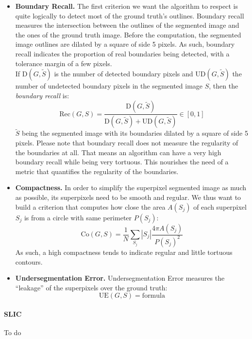 \documentclass{article}
\begin{document}
            \begin{itemize}
                \item \textbf{Boundary Recall.} The first criterion we want the algorithm to respect is quite logically to detect most of the ground truth's outlines. Boundary recall measures the intersection between the outlines of the segmented image and the ones of the ground truth image. Before the computation, the segmented image outlines are dilated by a square of side 5 pixels. As such, boundary recall indicates the proportion of real boundaries being detected, with a tolerance margin of a few pixels.\\
                If $\text{D}(G,\tilde{S})$ is the number of detected boundary pixels and $\text{UD}(G,\tilde{S})$ the number of undetected boundary pixels in the segmented image $S$, then the \textit{boundary recall} is:
                $$
                \mathrm{Rec}(G,S)=\frac{\mathrm{D}(G,\tilde{S})}{\mathrm{D}(G,\tilde{S})+\mathrm{UD}(G,\tilde{S})} \in [0,1]
                $$
                $\tilde{S}$ being the segmented image with its boundaries dilated by a square of side 5 pixels. Please note that boundary recall does not measure the regularity of the boundaries at all. That means an algorithm can have a very high boundary recall while being very tortuous. This nourishes the need of a metric that quantifies the regularity of the boundaries.

                \item \textbf{Compactness.} In order to simplify the superpixel segmented image as much as possible, its superpixels need to be smooth and regular. We thus want to build a criterion that computes how close the area $A(S_j)$ of each superpixel $S_j$ is from a circle with same perimeter $P(S_j)$:
                $$
                \mathrm{Co}(G, S)=\frac{1}{N} \sum_{S_j}|S_j| \frac{4 \pi A(S_j)}{P(S_j)^2}
                $$
                As such, a high compactness tends to indicate regular and little tortuous contours.

                \item \textbf{Undersegmentation Error.} Undersegmentation Error measures the ``leakage'' of the superpixels over the ground truth:
                $$
                \mathrm{UE}(G,S) = \text{formula}
                $$
            \end{itemize}

            \paragraph{SLIC} To do
\end{document}
